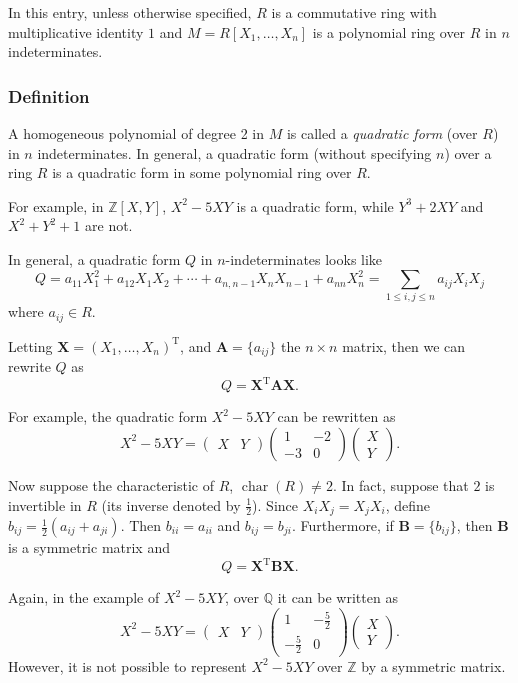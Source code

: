 \documentclass[12pt]{article}
\newcommand{\bX}{\mathbf{X}}
\newcommand{\bA}{\mathbf{A}}
\newcommand{\bB}{\mathbf{B}}
\newcommand{\0}{\mathbf{0}}
\begin{document}
In this entry, unless otherwise specified, $R$ is a commutative ring with multiplicative identity $1$ and $M=R[X_1,\ldots,X_n]$ is a polynomial ring over $R$ in $n$ indeterminates.

\subsubsection*{Definition}

A homogeneous polynomial of degree 2 in $M$ is called a \emph{quadratic form} (over $R$) in $n$ indeterminates.  In general, a quadratic form (without specifying $n$) over a ring $R$ is a quadratic form in some polynomial ring over $R$.  

For example, in $\mathbb{Z}[X,Y]$, $X^2-5XY$ is a quadratic form, while $Y^3+2XY$ and $X^2+Y^2+1$ are not.

In general, a quadratic form $Q$ in $n$-indeterminates looks like 
$$Q=a_{11}X_1^2+a_{12}X_1X_2+\cdots+a_{n,n-1}X_nX_{n-1}+a_{nn}X_n^2=\sum_{1\le i,j \le n}a_{ij}X_iX_j$$ where $a_{ij}\in R$.

Letting $\bX=(X_1,\ldots,X_n)^{\mathrm{T}}$, and $\bA=\lbrace a_{ij} \rbrace$ the $n\times n$ matrix, then we can rewrite $Q$ as
$$Q={\bX}^{\mathrm{T}} \bA \bX.$$

For example, the quadratic form $X^2-5XY$ can be rewritten as 
$$X^2-5XY=\begin{pmatrix} X & Y \end{pmatrix}\begin{pmatrix} 1 & -2 \\ -3 & 0 \end{pmatrix}\begin{pmatrix} X  \\ Y \end{pmatrix}.$$

Now suppose the characteristic of $R$, $\operatorname{char}(R)\ne 2$.  In fact, suppose that $2$ is invertible in $R$ (its inverse denoted by $\frac{1}{2}$).  Since $X_iX_j=X_jX_i$, define $b_{ij}=\frac{1}{2}(a_{ij}+a_{ji})$.  Then $b_{ii}=a_{ii}$ and $b_{ij}=b_{ji}$.  Furthermore, if $\bB=\lbrace b_{ij}\rbrace$, then $\bB$ is a symmetric matrix and 
$$Q={\bX}^{\mathrm{T}} \bB \bX.$$

Again, in the example of $X^2-5XY$, over $\mathbb{Q}$ it can be written as 
$$X^2-5XY=\begin{pmatrix} X & Y \end{pmatrix}\begin{pmatrix} 1 & -\frac{5}{2} \\ -\frac{5}{2} & 0 \end{pmatrix}\begin{pmatrix} X  \\ Y \end{pmatrix}.$$
However, it is not possible to represent $X^2-5XY$ over $\mathbb{Z}$ by a symmetric matrix.
\end{document}

